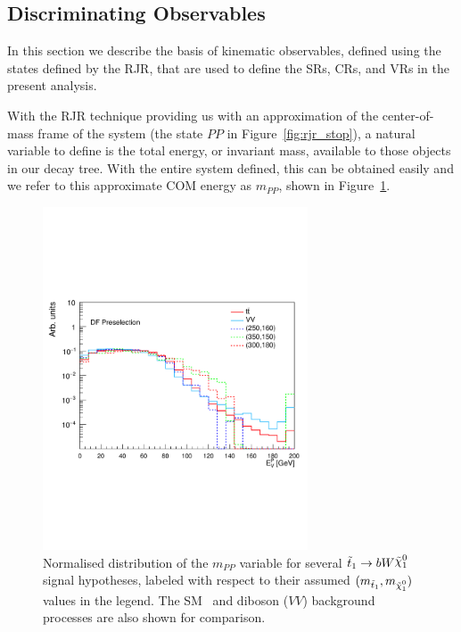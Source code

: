 \FloatBarrier
%
%

\subsection{Discriminating Observables}
\label{sec:stop_variables}

In this section we describe the basis of kinematic observables, defined using the states defined
by the RJR, that are used to define the SRs, CRs, and VRs in the present analysis.

With the RJR technique providing us with an approximation of the center-of-mass frame of the
\stop system (the state $PP$ in Figure~\ref{fig:rjr_stop}), a natural variable to define is the
total energy, or invariant mass, available to those objects in our decay tree.
With the entire system defined, this can be obtained easily and we refer to this
approximate COM energy as $m_{PP}$, shown in Figure~\ref{fig:rjr_mpp}.

\begin{figure}[!htb]
    \begin{center}
        \includegraphics[width=0.7\textwidth]{figures/search_stop2l/strategy/comp_plots/dfpresel_MDR}
        \caption{
            Normalised distribution of the $m_{PP}$ variable for several $\stopone \rightarrow b W \ninoone$
            signal hypotheses, labeled with respect to their assumed $(m_{\stopone}, m_{\ninoone})$ values in the
            legend.
            The SM \ttbar~and diboson ($VV$) background processes are also shown for comparison.
        }
        \label{fig:rjr_mpp}
    \end{center}
\end{figure}

